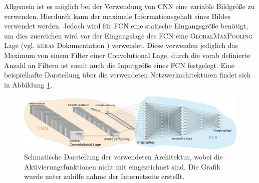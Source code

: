 Allgemein ist es möglich bei der Verwendung von CNN eine variable Bildgröße
zu verwenden. Hierdurch kann der maximale Informationsgehalt eines Bildes
verwendet werden. Jedoch wird für FCN eine statische Eingangsgröße benötigt,
um dies zuereichen wird vor der Eingangslage des FCN eine \textsc{GlobalMaxPooling}
Lage (vgl. \textsc{keras} Dokumentation \cite{keras_max_pooling}) verwendet.
Diese verwenden jediglich das Maximum von einem Filter einer Convolutional Lage,
durch die vorab definierte Anzahl an Filtern ist somit auch die Inputgröße eines
FCN festgelegt.
Eine beispielhafte Darstellung über die verwendeten Netzwerkachitekturen findet sich
in Abbildung \ref{fig:beispielhafte_netz_architecture}.
\begin{figure}
\centering
\includegraphics[width=\the\textwidth]{../../final_data/general/sample_network.pdf}
\caption{Schmatische Darstellung der verwendeten Architektur, wobei
         die Aktivierungsfunktionen nicht mit eingezeichnet sind.
         Die Grafik wurde unter zuhilfe nahme der Internetseite \cite{net_svg_source} erstellt.}
\label{fig:beispielhafte_netz_architecture}
\end{figure}

